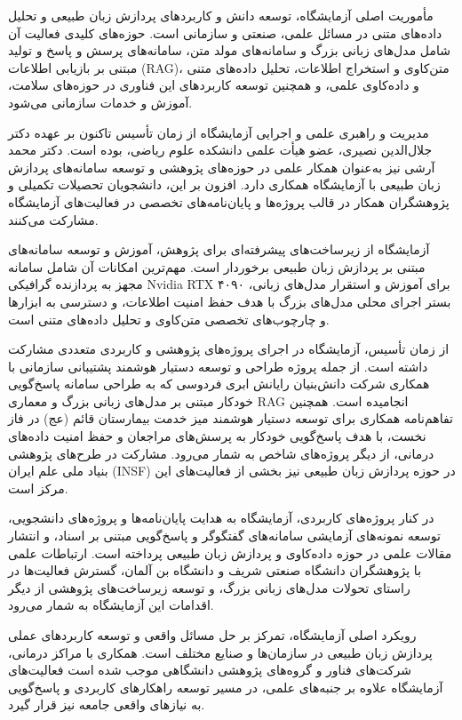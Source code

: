 \documentclass[
  letterpaper,
  DIV=11,
  numbers=noendperiod]{scrreprt}
\begin{document}
مأموریت اصلی آزمایشگاه، توسعه دانش و کاربردهای پردازش زبان طبیعی و تحلیل
داده‌های متنی در مسائل علمی، صنعتی و سازمانی است. حوزه‌های کلیدی فعالیت آن
شامل مدل‌های زبانی بزرگ و سامانه‌های مولد متن، سامانه‌های پرسش و پاسخ و
تولید مبتنی بر بازیابی اطلاعات (RAG)، متن‌کاوی و استخراج اطلاعات، تحلیل
داده‌های متنی و داده‌کاوی علمی، و همچنین توسعه کاربردهای این فناوری در
حوزه‌های سلامت، آموزش و خدمات سازمانی می‌شود.

مدیریت و راهبری علمی و اجرایی آزمایشگاه از زمان تأسیس تاکنون بر عهده
دکتر جلال‌الدین نصیری، عضو هیأت علمی دانشکده علوم ریاضی، بوده است. دکتر
محمد آرشی نیز به‌عنوان همکار علمی در حوزه‌های پژوهشی و توسعه سامانه‌های
پردازش زبان طبیعی با آزمایشگاه همکاری دارد. افزون بر این، دانشجویان
تحصیلات تکمیلی و پژوهشگران همکار در قالب پروژه‌ها و پایان‌نامه‌های تخصصی در
فعالیت‌های آزمایشگاه مشارکت می‌کنند.

آزمایشگاه از زیرساخت‌های پیشرفته‌ای برای پژوهش، آموزش و توسعه سامانه‌های
مبتنی بر پردازش زبان طبیعی برخوردار است. مهم‌ترین امکانات آن شامل سامانه
مجهز به پردازنده گرافیکی Nvidia RTX ۴۰۹۰ برای آموزش و استقرار مدل‌های
زبانی، بستر اجرای محلی مدل‌های بزرگ با هدف حفظ امنیت اطلاعات، و دسترسی به
ابزارها و چارچوب‌های تخصصی متن‌کاوی و تحلیل داده‌های متنی است.

از زمان تأسیس، آزمایشگاه در اجرای پروژه‌های پژوهشی و کاربردی متعددی
مشارکت داشته است. از جمله پروژه طراحی و توسعه دستیار هوشمند پشتیبانی
سازمانی با همکاری شرکت دانش‌بنیان رایانش ابری فردوسی که به طراحی سامانه
پاسخ‌گویی خودکار مبتنی بر مدل‌های زبانی بزرگ و معماری RAG انجامیده است.
همچنین تفاهم‌نامه همکاری برای توسعه دستیار هوشمند میز خدمت بیمارستان قائم
(عج) در فاز نخست، با هدف پاسخ‌گویی خودکار به پرسش‌های مراجعان و حفظ امنیت
داده‌های درمانی، از دیگر پروژه‌های شاخص به شمار می‌رود. مشارکت در طرح‌های
پژوهشی بنیاد ملی علم ایران (INSF) در حوزه پردازش زبان طبیعی نیز بخشی از
فعالیت‌های این مرکز است.

در کنار پروژه‌های کاربردی، آزمایشگاه به هدایت پایان‌نامه‌ها و پروژه‌های
دانشجویی، توسعه نمونه‌های آزمایشی سامانه‌های گفتگوگر و پاسخ‌گویی مبتنی بر
اسناد، و انتشار مقالات علمی در حوزه داده‌کاوی و پردازش زبان طبیعی پرداخته
است. ارتباطات علمی با پژوهشگران دانشگاه صنعتی شریف و دانشگاه بن آلمان،
گسترش فعالیت‌ها در راستای تحولات مدل‌های زبانی بزرگ، و توسعه زیرساخت‌های
پژوهشی از دیگر اقدامات این آزمایشگاه به شمار می‌رود.

رویکرد اصلی آزمایشگاه، تمرکز بر حل مسائل واقعی و توسعه کاربردهای عملی
پردازش زبان طبیعی در سازمان‌ها و صنایع مختلف است. همکاری با مراکز درمانی،
شرکت‌های فناور و گروه‌های پژوهشی دانشگاهی موجب شده است فعالیت‌های آزمایشگاه
علاوه بر جنبه‌های علمی، در مسیر توسعه راهکارهای کاربردی و پاسخ‌گویی به
نیازهای واقعی جامعه نیز قرار گیرد.
\end{document}
